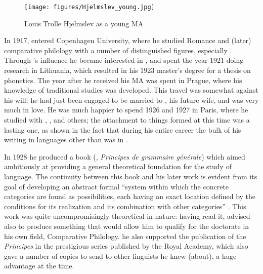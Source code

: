 \begin{wrapfigure}[14]{l}{.35\textwidth}
  \texttt{[image: figures/Hjelmslev\_young.jpg]}
  \caption{Louis Trolle Hjelmslev as a young MA}
  \label{fig:ch.hjelmslev.young_hjelmslev}
\end{wrapfigure}
In 1917, {\Hjelmslev} entered Copenhagen University, where he studied
Romance and (later) comparative philology with a number of
distinguished figures, especially . Through {\Pedersen}'s
influence he became interested in , and spent the year 1921
doing research in Lithuania, which resulted in his 1923 master's
degree for a thesis on  phonetics. The year after he
received his MA was spent in Prague, where his knowledge of
traditional  studies was developed. This travel was
somewhat against his will: he had just been engaged to be married to
, his future wife, and was very much in love.  He was
much happier to spend 1926 and 1927 in Paris, where he studied with
{\Meillet}, {\Vendryes}, and others; the attachment to things  formed
at this time was a lasting one, as shown in the fact that during his
entire career the bulk of his writing in languages other than 
was in .

In 1928 he produced a book (\citealt{hjelmslev28:principes},
\textsl{Principes de grammaire générale}) which aimed ambitiously at
providing a general theoretical foundation for the study of
language. The continuity between this book and his later work is
evident from its goal of developing an abstract formal ``system within
which the concrete categories are found as possibilities, each having
an exact location defined by the conditions for its realization and
its combination with other categories''
\citep{efj65:hjelmslev.obit}. This work was quite uncompromisingly
theoretical in nature: having read it, {\Pedersen} advised {\Hjelmslev} also
to produce something that would allow him to qualify for the doctorate
in his own field,  Comparative Philology. he also
supported the publication of the \textsl{Principes} in the prestigious
series published by the Royal Academy, which also gave {\Hjelmslev} a
number of copies to send to other linguists he knew (about), a huge
advantage at the time.

